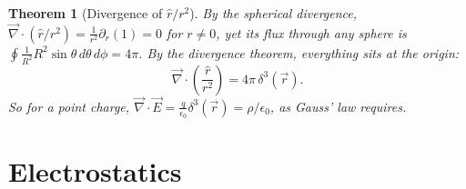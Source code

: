 \documentclass{article}
\newtheorem{theorem}{Theorem}
\begin{document}
\begin{theorem}[Divergence of $\hat{r}/r^2$]
    \label{div-r2}
    By the spherical divergence, $\vec{\nabla}\cdot\left(\hat{r}/r^2\right) = \frac{1}{r^2}\partial_r(1) = 0$ for $r \neq 0$, yet its flux through any sphere is $\oint\frac{1}{R^2}R^2\sin\theta\,d\theta\,d\phi = 4\pi$. By the divergence theorem, everything sits at the origin:
    \begin{equation}
        \vec{\nabla}\cdot\left(\frac{\hat{r}}{r^2}\right) = 4\pi\,\delta^3(\vec{r}).
    \end{equation}
    So for a point charge, $\vec{\nabla}\cdot\vec{E} = \frac{q}{\epsilon_0}\delta^3(\vec{r}) = \rho/\epsilon_0$, as Gauss' law requires.
\end{theorem}


\section{Electrostatics}
\end{document}
